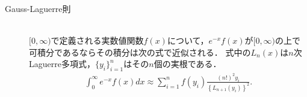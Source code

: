 \documentclass[a4j,papersize,disablejfam,slide,14pt]{jsarticle}
\def\exp#1{e^{#1}} %
\begin{document}
    \begin{screen}
    \begin{description}
    	\item[{\rm Gauss-Laguerre}則]\mbox{}\\
        $[0, \infty)$で定義される実数値関数$f(x)$について，$\exp{-x}f(x)$が$[0, \infty)$の上で可積分であるならその積分は次の式で近似される．
        式中の$L_n(x)$は$n$次{\rm Laguerre}多項式，$\{y_i\}_{i=1}^{n}$はその$n$個の実根である．
    		\begin{align}
    			\int_{0}^{\infty} \exp{-x} f(x) dx \approx \sum_{i=1}^{n} f(y_i) \frac{(n!)^2 y_i}{\left\{L_{n+1}(y_i)\right\}^2}.
    		\end{align}
    \end{description}
    \end{screen}
    
\end{document}
